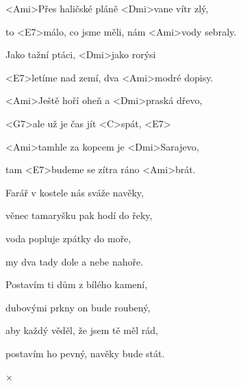 

\zs
<Ami>Přes haličské pláně <Dmi>vane vítr zlý,

to <E7>málo, co jsme měli, nám <Ami>vody sebraly.

Jako tažní ptáci, <Dmi>jako rorýsi

<E7>letíme nad zemí, dva <Ami>modré dopisy.
\ks


\zr
<Ami>Ještě hoří oheň a <Dmi>praská dřevo,

<G7>ale už je čas jít <C>spát, <E7>

<Ami>tamhle za kopcem je <Dmi>Sarajevo,

tam <E7>budeme se zítra ráno <Ami>brát.
\kr

\zs
Farář v kostele nás sváže navěky,

věnec tamaryšku pak hodí do řeky,

voda popluje zpátky do moře,

my dva tady dole a nebe nahoře.
\ks

\zr \kr

\zs
Postavím ti dům z bílého kamení,

dubovými prkny on bude roubený,

aby každý věděl, že jsem tě měl rád,

postavím ho pevný, navěky bude stát.
\ks


× \kr

\kp
